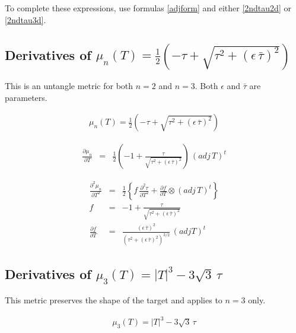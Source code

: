 \documentclass{report}
\begin{document}
\noindent To complete these expressions, use formulas \ref{adjform} and either 
\ref{2ndtau2d} or \ref{2ndtau3d}. \newline

\subsection{Derivatives of $\mu_n(T) = \frac{1}{2} \left( - \tau + \sqrt{\tau^2 + \left(\epsilon \, \bar{\tau} \right)^2} \right)$ \label{untangle2}}

\noindent This is an untangle metric for both $n=2$ and $n=3$. Both 
$\epsilon$ and $\bar{\tau}$ are parameters. \newline

\begin{eqnarray} 
\mu_n(T) = \frac{1}{2} \left( - \tau + \sqrt{\tau^2 + \left(\epsilon \, \bar{\tau} \right)^2} \right)
\end{eqnarray}

\begin{eqnarray}
\frac{\partial \mu_n}{\partial T} & = & \frac{1}{2} \left( -1 + \frac{\tau}{\sqrt{\tau^2 + \left(\epsilon \, \bar{\tau} \right)^2}} \right) \, (adj \, T)^t 
\end{eqnarray}

\begin{eqnarray}
\frac{\partial^2 \mu_n}{\partial T^2} & = & \frac{1}{2} \left\{ f \, \frac{\partial^2 \tau}{\partial T^2} + \frac{\partial f}{\partial T} \otimes (adj \, T)^t \right\} \\
f & = & -1 +  \frac{\tau}{\sqrt{\tau^2 + \left(\epsilon \, \bar{\tau} \right)^2}} \\
\frac{\partial f}{\partial T} & = & \frac{(\epsilon \, \bar{\tau})^2}{\left(\tau^2 + \left(\epsilon \, \bar{\tau} \right)^2 \right)^{3/2}} \, (adj T)^t
\end{eqnarray}


\subsection{Derivatives of $\mu_3(T) = |T|^3 - 3 \sqrt{3} \, \tau$ \label{shape3d}}

\noindent This metric preserves the shape of the target and applies 
to $n=3$ only. \newline

\begin{eqnarray}
\mu_3 (T) = |T|^3 - 3 \sqrt{3} \, \tau
\end{eqnarray}
\end{document}
